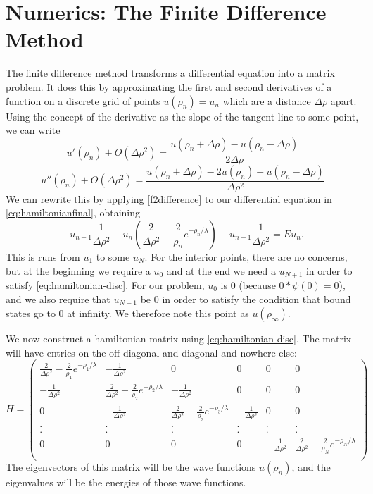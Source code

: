 \documentclass[12pt,twoside]{reedthesis}
\newcommand{\eqn}[1]{\begin{equation}#1\end{equation}}
\begin{document}
\section{Numerics: The Finite Difference Method}
The finite difference method transforms a differential equation into a matrix problem. It does this by approximating the first and second derivatives of a function on a discrete grid of points $u(\rho_n) = u_n$ which are a distance $\Delta \rho$ apart. Using the concept of the derivative as the slope of the tangent line to some point, we can write
\eqn{
u'(\rho_n) + O(\Delta{\rho}^2) = \frac{u(\rho_n + \Delta \rho) - u(\rho_n - \Delta \rho)}{2 \Delta \rho}
\label{fdifference}
}
\eqn{
u''(\rho_n) + O(\Delta{\rho}^2) = \frac{u(\rho_n + \Delta \rho) - 2 u(\rho_n) + u(\rho_n - \Delta \rho)}{\Delta \rho^2}
\label{f2difference}
}
We can rewrite this by applying \eqref{f2difference} to our differential equation in \eqref{eq:hamiltonianfinal}, obtaining
\eqn{
-u_{n-1}\frac{1}{\Delta \rho^2} - u_n\left(\frac{2} {\Delta \rho^2} -  \frac{2}{\rho_n}e^{-\rho_n/\lambda} \right) - u_{n-1}\frac{1}{\Delta \rho^2}  = E u_n\mbox{.}
\label{eq:hamiltonian-disc}
}
This is runs from $u_1$ to some $u_N$. For the interior points, there are no concerns, but at the beginning we require a $u_0$ and at the end we need a $u_{N+1}$ in order to satisfy \eqref{eq:hamiltonian-disc}. For our problem, $u_0$ is 0 (because $0 * \psi(0) = 0$), and we also require that $u_{N+1}$ be 0 in order to satisfy the condition that bound states go to 0 at infinity. We therefore note this point as $u(\rho_{\infty})$. 

We now construct a hamiltonian matrix using \eqref{eq:hamiltonian-disc}. The matrix will have entries on the off diagonal and diagonal and nowhere else:
\begin{equation*}H = \left(
\begin{array}{cccccc}
\frac{2} {\Delta \rho^2} -  \frac{2}{\rho_1}e^{-\rho_1/\lambda} & -\frac{1}{\Delta \rho^2} &  0 & 0 & 0 & 0 \\
-\frac{1}{\Delta \rho^2} & \frac{2} {\Delta \rho^2} -  \frac{2}{\rho_2}e^{-\rho_2/\lambda} &  -\frac{1}{\Delta \rho^2}  & 0 & 0 & 0 \\
0 &  -\frac{1}{\Delta \rho^2} & \frac{2} {\Delta \rho^2} -  \frac{2}{\rho_3}e^{-\rho_3/\lambda} &  -\frac{1}{\Delta \rho^2}  & 0 & 0 \\
 .&  . &.  &. & .& .  \\
 .& . & . & .& .&  . \\
0 & 0 &  0 & 0&  -\frac{1}{\Delta \rho^2} & \frac{2} {\Delta \rho^2} -  \frac{2}{\rho_N}e^{-\rho_N/\lambda}   \\
\end{array}
\right)
\end{equation*}
The eigenvectors of this matrix will be the wave functions $u(\rho_n)$, and the eigenvalues will be the energies of those wave functions.
\end{document}

